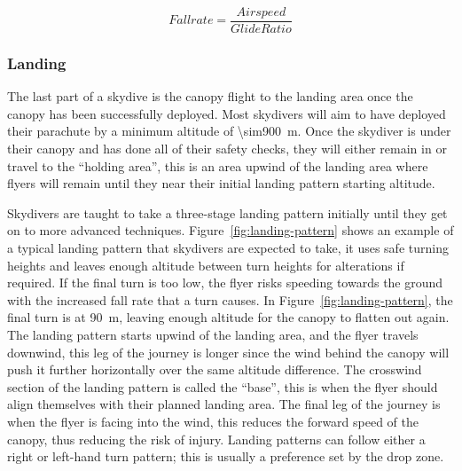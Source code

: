 \begin{equation}\label{eq:fallrate}
  Fallrate = \frac{Airspeed}{Glide Ratio}
\end{equation}

\subsubsection{Landing}
The last part of a skydive is the canopy flight to the landing area once the canopy has been successfully deployed. Most skydivers will aim to have deployed their parachute by a minimum altitude of \SI{\sim900}{\metre}.
Once the skydiver is under their canopy and has done all of their safety checks, they will either remain in or travel to the ``holding area'', this is an area upwind of the landing area where flyers will remain until they near their initial landing pattern starting altitude.

Skydivers are taught to take a three-stage landing pattern initially until they get on to more advanced techniques. Figure~\vref{fig:landing-pattern} shows an example of a typical landing pattern that skydivers are expected to take, it uses safe turning heights and leaves enough altitude between turn heights for alterations if required. If the final turn is too low, the flyer risks speeding towards the ground with the increased fall rate that a turn causes. In Figure~\vref{fig:landing-pattern}, the final turn is at \SI{90}{\metre}, leaving enough altitude for the canopy to flatten out again. The landing pattern starts upwind of the landing area, and the flyer travels downwind, this leg of the journey is longer since the wind behind the canopy will push it further horizontally over the same altitude difference. The crosswind section of the landing pattern is called the ``base'', this is when the flyer should align themselves with their planned landing area. The final leg of the journey is when the flyer is facing into the wind, this reduces the forward speed of the canopy, thus reducing the risk of injury. Landing patterns can follow either a right or left-hand turn pattern; this is usually a preference set by the drop zone.

